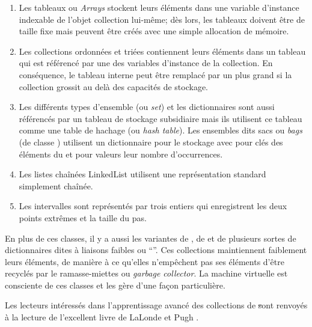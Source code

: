 \documentclass[a4paper,10pt,twoside]{book}
\begin{document}
\begin{enumerate}
  \item Les tableaux ou \emph{Arrays} stockent leurs éléments dans une
variable d'instance indexable de l'objet collection lui-même; 
dès lors, les tableaux doivent être de taille fixe mais peuvent être
créés avec une simple allocation de mémoire.
  \item Les collections ordonnées  et triées 
 contiennent leurs éléments dans un tableau
qui est référencé par une des variables d'instance de la collection.
En conséquence, le tableau interne peut être remplacé par un 
plus grand si la collection grossit au delà des capacités de 
stockage.
  \item Les différents types d'ensemble (ou \emph{set}) et les dictionnaires
sont aussi référencés par un tableau de stockage subsidiaire
mais ils utilisent ce tableau comme une table de hachage (ou \emph{hash table}). Les ensembles dits sacs ou \emph{bags} (de classe ) utilisent
un dictionnaire  pour le stockage avec pour clés
des éléments du  et pour valeurs leur nombre d'occurrences.
  \item Les listes chaînées LinkedList utilisent une
représentation standard simplement chaînée.
  \item Les intervalles  sont représentés 
par trois entiers qui enregistrent les deux points extrêmes et la taille du pas.
\end{enumerate}
En plus de ces classes, il y a aussi les variantes de \mbox{,} de  et de plusieurs sortes de dictionnaires dites à liaisons faibles ou ``''. Ces collections maintiennent faiblement leurs éléments, \ie de manière à ce qu'elles n'empêchent pas ses éléments d'être
recyclés par le ramasse-miettes ou \emph{garbage collector}.
La machine virtuelle \pharo est consciente de ces classes et les gère d'une façon particulière.

Les lecteurs intéressés dans l'apprentissage avancé des collections
de \st sont renvoyés à la lecture de l'excellent livre de LaLonde et Pugh
\cite{LaLo90a}.

\end{document}
